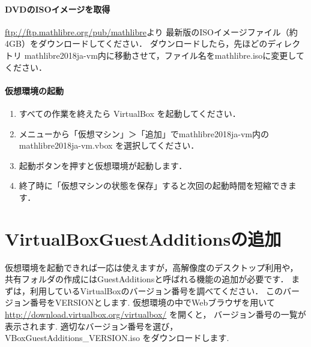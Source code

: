 \documentclass[a4j]{ltjsarticle}
\newcommand{\vm}{mathlibre2018ja-vm}
\begin{document}
\paragraph{DVDのISOイメージを取得}
\url{ftp://ftp.mathlibre.org/pub/mathlibre}より
最新版のISOイメージファイル（約4GB）をダウンロードしてください．
ダウンロードしたら，先ほどのディレクトリ \vm 内に移動させて，ファイル名をmathlibre.isoに変更してください．


\paragraph{仮想環境の起動}
\begin{enumerate}
 \item すべての作業を終えたら VirtualBox を起動してください．
 \item メニューから「仮想マシン」＞「追加」で\vm 内の \vm.vbox を選択してください．
 \item 起動ボタンを押すと仮想環境が起動します．
 \item 終了時に「仮想マシンの状態を保存」すると次回の起動時間を短縮できます．
\end{enumerate}

\section{VirtualBoxGuestAdditionsの追加}
仮想環境を起動できれば一応は使えますが，高解像度のデスクトップ利用や，
共有フォルダの作成にはGuestAdditionsと呼ばれる機能の追加が必要です．
まずは，利用しているVirtualBoxのバージョン番号を調べてください．
このバージョン番号をVERSIONとします. 
仮想環境の中でWebブラウザを用いて
\url{http://download.virtualbox.org/virtualbox/} を開くと，
バージョン番号の一覧が表示されます. 適切なバージョン番号を選び，
VBoxGuestAdditions\_VERSION.iso
をダウンロードします. 
\end{document}
